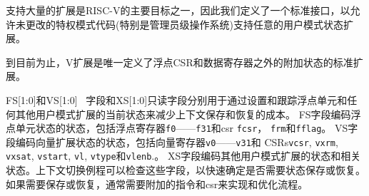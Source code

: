 支持大量的扩展是RISC-V的主要目标之一，因此我们定义了一个标准接口，以允许未更改的特权模式代码(特别是管理员级操作系统)支持任意的用户模式状态扩展。

\iffalse
\begin{commentary}
  To date, the V extension is the only standard extension that defines
  additional state beyond the floating-point CSR and data registers.
\end{commentary}
\fi

\begin{commentary}
到目前为止，V扩展是唯一定义了浮点CSR和数据寄存器之外的附加状态的标准扩展。
\end{commentary}

\iffalse
The FS[1:0] and VS[1:0] \warl\ fields and the XS[1:0] read-only field are used
to reduce the cost of context save and restore by setting and tracking
the current state of the floating-point unit and any other user-mode
extensions respectively.
The FS field encodes the status of the floating-point unit state, including
the floating-point registers {\tt f0}--{\tt f31} and the CSRs
{\tt fcsr}, {\tt frm}, and {\tt fflags}.
The VS field encodes the status of the vector extension state, including
the vector registers {\tt v0}--{\tt v31} and the CSRs
{\tt vcsr}, {\tt vxrm}, {\tt vxsat}, {\tt vstart}, {\tt vl}, {\tt vtype},
and {\tt vlenb}.
The XS field encodes the
status of additional user-mode extensions and associated state.
These fields can be checked by a context switch routine to quickly
determine whether a state save or restore is required.  If a save or
restore is required, additional instructions and CSRs are typically
required to effect and optimize the process.
\fi

FS[1:0]和VS[1:0] \warl\ 字段和XS[1:0]只读字段分别用于通过设置和跟踪浮点单元和任何其他用户模式扩展的当前状态来减少上下文保存和恢复的成本。
FS字段编码浮点单元状态的状态，包括浮点寄存器{\tt f0}——{\tt f31}和csr {\tt fcsr}， {\tt frm}和{\tt fflag}。
VS字段编码向量扩展状态的状态，包括向量寄存器{\tt v0}——{\tt v31}和 CSRs{\tt vcsr}, {\tt vxrm}, {\tt vxsat}, {\tt vstart}, {\tt vl}, {\tt vtype}和{\tt vlenb}.。
XS字段编码其他用户模式扩展的状态和相关状态。上下文切换例程可以检查这些字段，以快速确定是否需要状态保存或恢复。如果需要保存或恢复，通常需要附加的指令和csr来实现和优化流程。

\iffalse
\begin{commentary}
  The design anticipates that most context switches will not need to
  save/restore state in either or both of the floating-point unit or
  other extensions, so provides a fast check via the SD bit.
\end{commentary}
\fi

